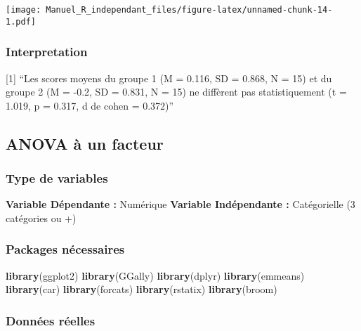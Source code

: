 \documentclass[
]{book}
\newenvironment{Shaded}{\begin{snugshade}}{\end{snugshade}}
\newcommand{\KeywordTok}[1]{\textcolor[rgb]{0.13,0.29,0.53}{\textbf{#1}}}
\newcommand{\NormalTok}[1]{#1}
\begin{document}
\texttt{[image: Manuel\_R\_independant\_files/figure-latex/unnamed-chunk-14-1.pdf]}

\hypertarget{interpretation}{%
\subsubsection{Interpretation}\label{interpretation}}

{[}1{]} ``Les scores moyens du groupe 1 (M = 0.116, SD = 0.868, N = 15) et du groupe 2 (M = -0.2, SD = 0.831, N = 15) ne diffèrent pas statistiquement (t = 1.019, p = 0.317, d de cohen = 0.372)''

\hypertarget{anova-uxe0-un-facteur}{%
\subsection{ANOVA à un facteur}\label{anova-uxe0-un-facteur}}

\hypertarget{type-de-variables-1}{%
\subsubsection{Type de variables}\label{type-de-variables-1}}

\textbf{Variable Dépendante :} Numérique
\textbf{Variable Indépendante :} Catégorielle (3 catégories ou +)

\hypertarget{packages-nuxe9cessaires-1}{%
\subsubsection{Packages nécessaires}\label{packages-nuxe9cessaires-1}}

\begin{Shaded}
\begin{Highlighting}[]
\KeywordTok{library}\NormalTok{(ggplot2)}
\KeywordTok{library}\NormalTok{(GGally)}
\KeywordTok{library}\NormalTok{(dplyr)}
\KeywordTok{library}\NormalTok{(emmeans)}
\KeywordTok{library}\NormalTok{(car)}
\KeywordTok{library}\NormalTok{(forcats)}
\KeywordTok{library}\NormalTok{(rstatix)}
\KeywordTok{library}\NormalTok{(broom)}
\end{Highlighting}
\end{Shaded}

\hypertarget{donnuxe9es-ruxe9elles-1}{%
\subsubsection{Données réelles}\label{donnuxe9es-ruxe9elles-1}}
\end{document}
